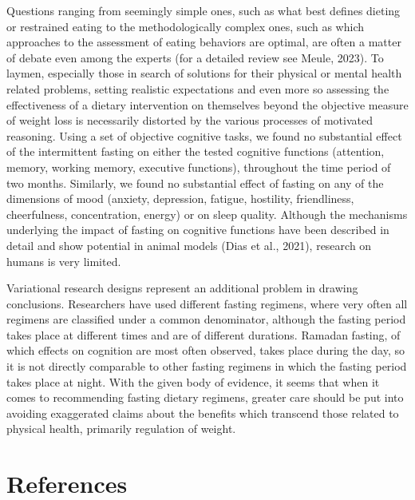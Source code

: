 \documentclass[authordate, empirical]{jote-new-article}
\begin{document}
Questions ranging from seemingly simple ones, such as what best defines dieting or restrained eating to the methodologically complex ones, such as which approaches to the assessment of eating behaviors are optimal, are often a matter of debate even among the experts (for a detailed review see Meule, 2023). To laymen, especially those in search of solutions for their physical or mental health related problems, setting realistic expectations and even more so assessing the effectiveness of a dietary intervention on themselves beyond the objective measure of weight loss is necessarily distorted by the various processes of motivated reasoning. Using a set of objective cognitive tasks, we found no substantial effect of the intermittent fasting on either the tested cognitive functions (attention, memory, working memory, executive functions), throughout the time period of two months. Similarly, we found no substantial effect of fasting on any of the dimensions of mood (anxiety, depression, fatigue, hostility, friendliness, cheerfulness, concentration, energy) or on sleep quality. Although the mechanisms underlying the impact of fasting on cognitive functions have been described in detail and show potential in animal models (Dias et al., 2021), research on humans is very limited.



Variational research designs represent an additional problem in drawing conclusions. Researchers have used different fasting regimens, where very often all regimens are classified under a common denominator, although the fasting period takes place at different times and are of different durations. Ramadan fasting, of which effects on cognition are most often observed, takes place during the day, so it is not directly comparable to other fasting regimens in which the fasting period takes place at night. With the given body of evidence, it seems that when it comes to recommending fasting dietary regimens, greater care should be put into avoiding exaggerated claims about the benefits which transcend those related to physical health, primarily regulation of weight.











\section{References }
\end{document}
